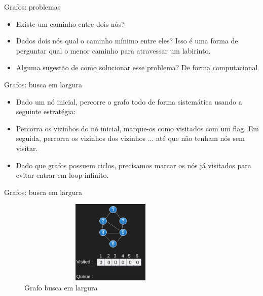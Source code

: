 \begin{frame}
	\begin{block}{Grafos: problemas}
		\begin{itemize}
			\item Existe um caminho entre dois nós?
			\item Dados dois nós qual o caminho mínimo entre eles? Isso é uma forma de perguntar qual o menor caminho para atravessar um labirinto.	
			\item Alguma sugestão de como solucionar esse problema? De forma computacional
		\end{itemize}
	\end{block}
\end{frame}

\begin{frame}
	\begin{block}{Grafos: busca em largura}
		\begin{itemize}
			\item Dado um nó inicial, percorre o grafo todo de forma sistemática usando a seguinte estratégia:	
			\item Percorra os vizinhos do nó inicial, marque-os como visitados com um flag. Em seguida, percorra os vizinhos dos vizinhos $\ldots$ até que não tenham nós sem visitar.	
			\item Dado que grafos possuem ciclos, precisamos marcar os nós já visitados para evitar entrar em loop infinito.
		\end{itemize}
	\end{block}
\end{frame}


\begin{frame}
	\begin{block}{Grafos: busca em largura}
		\begin{figure}[!htb]
			\centering	  
			\includegraphics[height=4cm, width = 9cm]{./pic/bfs1.png}
			\caption{Grafo busca em largura \cite{GEEKS_2018}}
		\end{figure}
	\end{block}
\end{frame}

